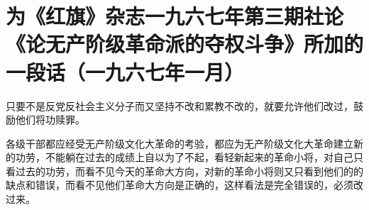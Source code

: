 \section[为《红旗》杂志一九六七年第三期社论《论无产阶级革命派的夺权斗争》所加的一段话（一九六七年一月）]{为《红旗》杂志一九六七年第三期社论《论无产阶级革命派的夺权斗争》所加的一段话（一九六七年一月）}


只要不是反党反社会主义分子而又坚持不改和累教不改的，就要允许他们改过，鼓励他们将功赎罪。

各级干部都应经受无产阶级文化大革命的考验，都应为无产阶级文化大革命建立新的功劳，不能躺在过去的成绩上自以为了不起，看轻新起来的革命小将，对自己只看过去的功劳，而看不见今天的革命大方向，对新的革命小将则又只看到他们的的缺点和错误，而看不见他们革命大方向是正确的，这样看法是完全错误的，必须改过来。


